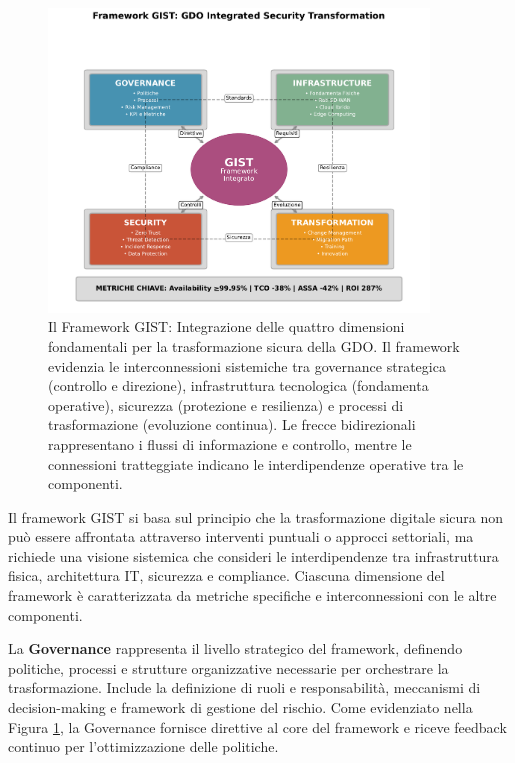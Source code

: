 \begin{bibunit}[IEEEtran]
\begin{figure}[htbp]
\centering
\includegraphics[width=0.9\textwidth]{thesis_figures/cap1/fig_1_1_gist_framework.pdf}
\caption{Il Framework GIST: Integrazione delle quattro dimensioni fondamentali per la trasformazione sicura della GDO. Il framework evidenzia le interconnessioni sistemiche tra governance strategica (controllo e direzione), infrastruttura tecnologica (fondamenta operative), sicurezza (protezione e resilienza) e processi di trasformazione (evoluzione continua). Le frecce bidirezionali rappresentano i flussi di informazione e controllo, mentre le connessioni tratteggiate indicano le interdipendenze operative tra le componenti.}
\label{fig:gist_framework}
\end{figure}

Il framework GIST si basa sul principio che la trasformazione digitale sicura non può essere affrontata attraverso interventi puntuali o approcci settoriali, ma richiede una visione sistemica che consideri le interdipendenze tra infrastruttura fisica, architettura IT, sicurezza e compliance. Ciascuna dimensione del framework è caratterizzata da metriche specifiche e interconnessioni con le altre componenti.

La \textbf{Governance} rappresenta il livello strategico del framework, definendo politiche, processi e strutture organizzative necessarie per orchestrare la trasformazione. Include la definizione di ruoli e responsabilità, meccanismi di decision-making e framework di gestione del rischio. Come evidenziato nella Figura \ref{fig:gist_framework}, la Governance fornisce direttive al core del framework e riceve feedback continuo per l'ottimizzazione delle politiche.


\end{bibunit}
